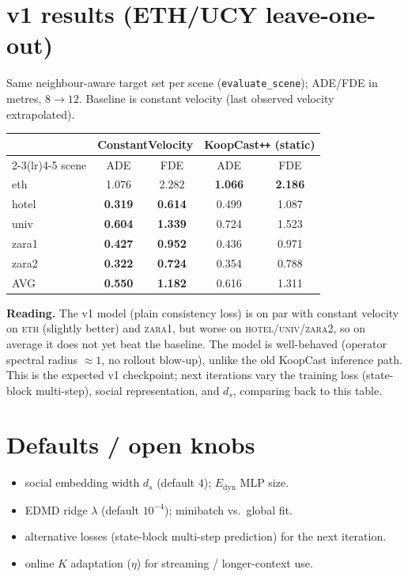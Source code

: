 \documentclass[11pt]{article}
\newcommand{\Kop}{K}
\begin{document}
\section{v1 results (ETH/UCY leave-one-out)}
Same neighbour-aware target set per scene (\texttt{evaluate\_scene}); ADE/FDE in
metres, $8\!\to\!12$. Baseline is constant velocity (last observed velocity
extrapolated).
\begin{center}
\begin{tabular}{lcccc}
\toprule
 & \multicolumn{2}{c}{ConstantVelocity} & \multicolumn{2}{c}{KoopCast\texttt{++} (static)}\\
\cmidrule(lr){2-3}\cmidrule(lr){4-5}
scene & ADE & FDE & ADE & FDE\\
\midrule
eth   & 1.076 & 2.282 & \textbf{1.066} & \textbf{2.186}\\
hotel & \textbf{0.319} & \textbf{0.614} & 0.499 & 1.087\\
univ  & \textbf{0.604} & \textbf{1.339} & 0.724 & 1.523\\
zara1 & \textbf{0.427} & \textbf{0.952} & 0.436 & 0.971\\
zara2 & \textbf{0.322} & \textbf{0.724} & 0.354 & 0.788\\
\midrule
AVG   & \textbf{0.550} & \textbf{1.182} & 0.616 & 1.311\\
\bottomrule
\end{tabular}
\end{center}
\noindent\textbf{Reading.} The v1 model (plain consistency loss) is on par with
constant velocity on \textsc{eth} (slightly better) and \textsc{zara1}, but worse
on \textsc{hotel}/\textsc{univ}/\textsc{zara2}, so on average it does not yet beat
the baseline. The model is well-behaved (operator spectral radius $\approx 1$, no
rollout blow-up), unlike the old KoopCast inference path. This is the expected v1
checkpoint; next iterations vary the training loss (state-block multi-step),
social representation, and $d_s$, comparing back to this table.

\section{Defaults / open knobs}\label{sec:open}
\begin{itemize}[nosep]
  \item social embedding width $d_s$ (default $4$); $E_{\text{dyn}}$ MLP size.
  \item EDMD ridge $\lambda$ (default $10^{-4}$); minibatch vs.\ global fit.
  \item alternative losses (state-block multi-step prediction) for the next
        iteration.
  \item online $\Kop$ adaptation ($\eta$) for streaming / longer-context use.
\end{itemize}
\end{document}
